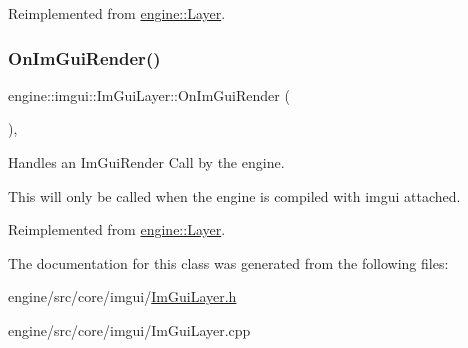 Reimplemented from \hyperlink{classengine_1_1Layer_acfa7e624cfd2cb85803382511454d098}{engine\+::\+Layer}.

\mbox{\label{classengine_1_1imgui_1_1ImGuiLayer_aeacc4aecfc119192fbe98e961b88813e}} 
\subsubsection{\texorpdfstring{On\+Im\+Gui\+Render()}{OnImGuiRender()}}
{\footnotesize\ttfamily engine\+::imgui\+::\+Im\+Gui\+Layer\+::\+On\+Im\+Gui\+Render (\begin{DoxyParamCaption}{ }\end{DoxyParamCaption})\hspace{0.3cm}{\ttfamily [override]}, {\ttfamily [virtual]}}



Handles an Im\+Gui\+Render Call by the engine. 

This will only be called when the engine is compiled with imgui attached. 

Reimplemented from \hyperlink{classengine_1_1Layer_a002df9fddaba135a8bd7abc14e3fb067}{engine\+::\+Layer}.



The documentation for this class was generated from the following files\+:\begin{DoxyCompactItemize}
\item 
engine/src/core/imgui/\hyperlink{ImGuiLayer_8h}{Im\+Gui\+Layer.\+h}\item 
engine/src/core/imgui/Im\+Gui\+Layer.\+cpp\end{DoxyCompactItemize}
